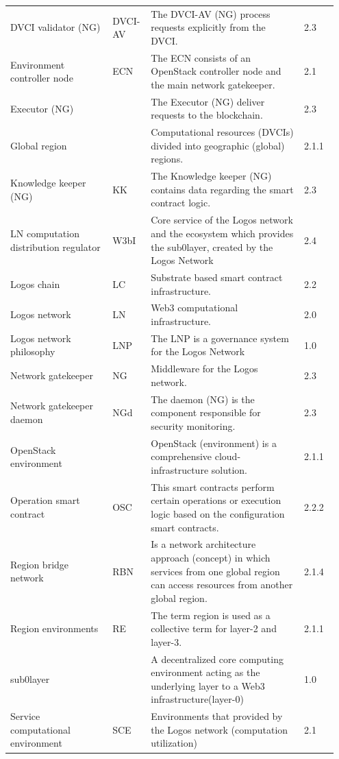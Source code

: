 \documentclass[]{article}
\begin{document}
\begin{longtable}{p{0.3\linewidth} p{0.1\linewidth} p{0.45\linewidth} p{0.1\linewidth}}
DVCI validator (NG) & DVCI-AV & The DVCI-AV (NG) process requests explicitly from the DVCI. & 2.3 \\ %
Environment controller node & ECN & The ECN consists of an OpenStack controller node and the main network gatekeeper. & 2.1 \\ %
Executor (NG) & & The Executor (NG) deliver requests to the blockchain. & 2.3 \\ %
Global region & & Computational resources (DVCIs) divided into geographic (global) regions. & 2.1.1 \\ %
Knowledge keeper (NG) & KK & The Knowledge keeper (NG) contains data regarding the smart contract logic. & 2.3 \\ %
LN computation distribution regulator & W3bI & Core service of the Logos network and the ecosystem which provides the sub0layer, created by the Logos Network & 2.4 \\ %
Logos chain & LC & Substrate based smart contract infrastructure. & 2.2 \\ %
Logos network & LN & Web3 computational infrastructure. & 2.0 \\ %
Logos network philosophy & LNP & The LNP is a governance system for the Logos Network & 1.0 \\ %
Network gatekeeper & NG & Middleware for the Logos network. & 2.3 \\ %
Network gatekeeper daemon & NGd & The daemon (NG) is the component responsible for security monitoring. & 2.3 \\ %
OpenStack environment & & OpenStack (environment) is a comprehensive cloud-infrastructure solution. & 2.1.1 \\ %
Operation smart contract & OSC & This smart contracts perform certain operations or execution logic based on the configuration smart contracts. & 2.2.2 \\ %
Region bridge network & RBN & Is a network architecture approach (concept) in which services from one global region can access resources from another global region. & 2.1.4 \\ %
Region environments & RE & The term region is used as a collective term for layer-2 and layer-3. & 2.1.1 \\ %
sub0layer & & A decentralized core computing environment acting as the underlying layer to a Web3 infrastructure(layer-0) & 1.0 \\ %
Service computational environment & SCE & Environments that provided by the Logos network (computation utilization)  & 2.1 \\ %

\end{longtable}
\end{document}

